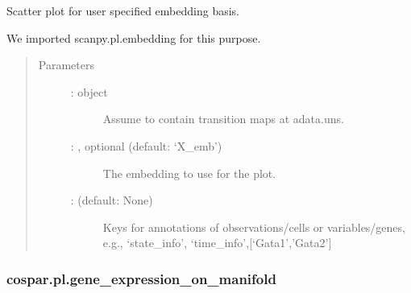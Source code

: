 \documentclass[letterpaper,10pt,english]{sphinxmanual}
\begin{document}
\begin{fulllineitems}
\label{\detokenize{cospar.pl.embedding:cospar.pl.embedding}}
Scatter plot for user specified embedding basis.

We imported scanpy.pl.embedding for this purpose.
\begin{quote}\begin{description}
\item[{Parameters}] \leavevmode\begin{description}
\item[{ :  object}] \leavevmode
Assume to contain transition maps at adata.uns.

\item[{ : , optional (default: ‘X\_emb’)}] \leavevmode
The embedding to use for the plot.

\item[{ :  (default: None)}] \leavevmode
Keys for annotations of observations/cells or variables/genes,
e.g., ‘state\_info’, ‘time\_info’,{[}‘Gata1’,’Gata2’{]}

\end{description}

\end{description}\end{quote}

\end{fulllineitems}



\subsubsection{cospar.pl.gene\_expression\_on\_manifold}
\label{\detokenize{cospar.pl.gene_expression_on_manifold:cospar-pl-gene-expression-on-manifold}}\label{\detokenize{cospar.pl.gene_expression_on_manifold::doc}}
\end{document}
